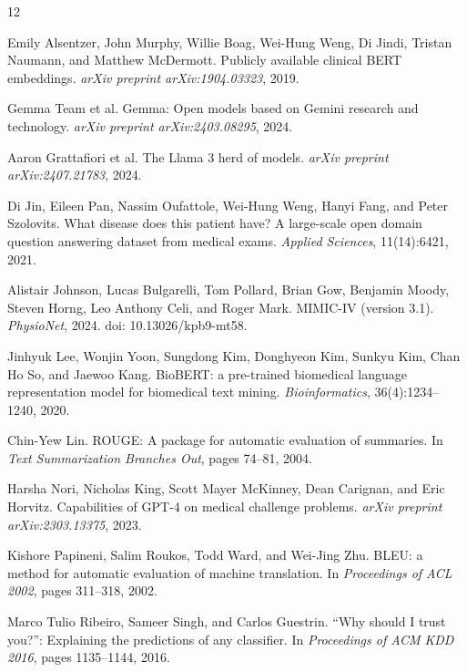\documentclass[10pt, twocolumn, a4paper]{article}
\begin{document}
\begin{thebibliography}{12}

Emily Alsentzer, John Murphy, Willie Boag, Wei-Hung Weng, Di Jindi, Tristan Naumann, and Matthew McDermott.
\newblock Publicly available clinical BERT embeddings.
\newblock \emph{arXiv preprint arXiv:1904.03323}, 2019.

Gemma Team et al.
\newblock Gemma: Open models based on Gemini research and technology.
\newblock \emph{arXiv preprint arXiv:2403.08295}, 2024.

Aaron Grattafiori et al.
\newblock The Llama 3 herd of models.
\newblock \emph{arXiv preprint arXiv:2407.21783}, 2024.

Di Jin, Eileen Pan, Nassim Oufattole, Wei-Hung Weng, Hanyi Fang, and Peter Szolovits.
\newblock What disease does this patient have? A large-scale open domain question answering dataset from medical exams.
\newblock \emph{Applied Sciences}, 11(14):6421, 2021.

Alistair Johnson, Lucas Bulgarelli, Tom Pollard, Brian Gow, Benjamin Moody, Steven Horng, Leo Anthony Celi, and Roger Mark.
\newblock MIMIC-IV (version 3.1).
\newblock \emph{PhysioNet}, 2024. doi: 10.13026/kpb9-mt58.

Jinhyuk Lee, Wonjin Yoon, Sungdong Kim, Donghyeon Kim, Sunkyu Kim, Chan Ho So, and Jaewoo Kang.
\newblock BioBERT: a pre-trained biomedical language representation model for biomedical text mining.
\newblock \emph{Bioinformatics}, 36(4):1234--1240, 2020.

Chin-Yew Lin.
\newblock ROUGE: A package for automatic evaluation of summaries.
\newblock In \emph{Text Summarization Branches Out}, pages 74--81, 2004.

Harsha Nori, Nicholas King, Scott Mayer McKinney, Dean Carignan, and Eric Horvitz.
\newblock Capabilities of GPT-4 on medical challenge problems.
\newblock \emph{arXiv preprint arXiv:2303.13375}, 2023.

Kishore Papineni, Salim Roukos, Todd Ward, and Wei-Jing Zhu.
\newblock BLEU: a method for automatic evaluation of machine translation.
\newblock In \emph{Proceedings of ACL 2002}, pages 311--318, 2002.

Marco Tulio Ribeiro, Sameer Singh, and Carlos Guestrin.
\newblock ``Why should I trust you?'': Explaining the predictions of any classifier.
\newblock In \emph{Proceedings of ACM KDD 2016}, pages 1135--1144, 2016.


\end{thebibliography}
\end{document}
